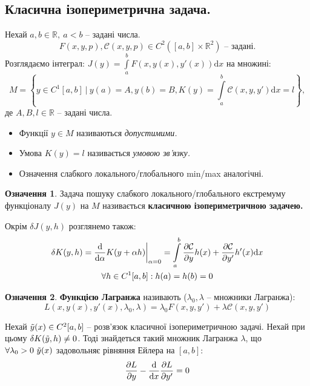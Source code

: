\documentclass[14pt,a4paper]{scrartcl}
\theoremstyle{definition}
\newtheorem*{defo}{Означення}
\theoremstyle{definition}
\theoremstyle{definition}
\begin{document}
\newpage

\subsection{Класична ізопериметрична задача.}
Нехай $a, b \in \mathbb{R}, \  a<b$ -- задані числа.
$$
F(x,y,p),\mathcal{C} (x,y , p) \in C^2  ([a,b] \times \mathbb{R}^2) \text{ -- задані.}
$$
Розглядаємо інтеграл:
$ \displaystyle
J(y) =  \int\limits_{a}^{ b}{ F(x, y(x), y'(x))} \mathrm{d} x
$ на множині:
$$
M = \left\lbrace
y \in C^1 [a,b]  \ \bigg| \  y(a) = A , y(b) = B, K(y) =  \int\limits_{a}^{b}{\mathcal{C} (x,y, y') \mathrm{d} x  = l }
 \right\rbrace,
$$
де $A, B, l \in \mathbb{R}$ -- задані числа.\par
\begin{itemize}
  \item Функції $y \in M$ називаються \textit{допустимими.}
  \item Умова $K(y) = l$ називається \textit{умовою зв'язку.}
  \item Означення слабкого локального/глобального min/max аналогічні.
\end{itemize}
\begin{defo}
 Задача пошуку слабкого локального/глобального екстремуму функціоналу $J(y)$ на $M$ називається \textbf{класичною ізопериметричною задачею.}
\end{defo}
Окрім $\delta J(y, h)$ розглянемо також:
$$
\begin{gathered}
\delta K(y,h ) = \frac{\mathrm{d}}{\mathrm{d} \alpha} K(y + \alpha h)\bigg|_{\alpha = 0} =  \int\limits_{a}^{b}{
\frac{\partial \mathcal{C}}{\partial y} h(x) +
\frac{\partial \mathcal{C}}{\partial y'} h'(x)  \mathrm{d} x
} \\
\forall h \in C^1[a,b] : h(a) = h(b) = 0
\end{gathered}
$$
\begin{defo} \! \textbf{Функцією Лагранжа} називають \!($\lambda_0, \lambda$ \!--\! множники Лагранжа):
  $$
  L(x, y(x) , y'(x), \lambda_0, \lambda) = \lambda_0 F(x, y, y') + \lambda\mathcal{C}(x, y, y')
  $$
\end{defo}
\begin{boxteo}
 Нехай $\tilde{y} (x) \in C^2[a,b]$ -- розв'язок класичної ізопериметричною задачі. Нехай при цьому $\delta K(\tilde{y}, h) \neq 0$. Тоді знайдеться такий множник Лагранжа $\lambda$, що $\forall \lambda_0 >0 \  \tilde{y}(x) $ задовольняє рівняння Ейлера на $[a,b]$:
 $$
 \frac{\partial L }{\partial y} - \frac{\mathrm{d}}{\mathrm{d} x} \frac{\partial L}{\partial y'} = 0
 $$
\end{boxteo}
\end{document}
